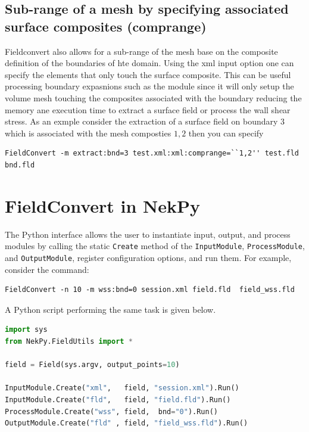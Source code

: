 %
%
\subsection{Sub-range of a mesh by specifying associated surface composites (comprange)}

Fieldconvert also allows for a sub-range of the mesh base on the
composite definition of the boundaries of hte domain. Using the xml
input option  one can specify the elements that only
touch the surface composite. This can be useful processing boundary
expasnions such as the  module since it will only setup
the volume mesh touching the composites associated with the boundary
reducing the memory ane execution time to extract a surface field or
process the wall shear stress.  As an exmple consider the extraction
of a surface field on boundary $3$ which is associated with the mesh
composties $1,2$ then you can specify
%
\begin{lstlisting}[style=BashInputStyle]
FieldConvert -m extract:bnd=3 test.xml:xml:comprange=``1,2'' test.fld bnd.fld
\end{lstlisting}

\section{FieldConvert in NekPy}

The Python interface allows the user to instantiate input,
output, and process modules by calling the static \verb+Create+ method of the
\verb+InputModule+, \verb+ProcessModule+, and \verb+OutputModule+,
register configuration options, and run them.
For example, consider the command:

\begin{lstlisting}[style=BashInputStyle]
FieldConvert -n 10 -m wss:bnd=0 session.xml field.fld  field_wss.fld
\end{lstlisting}


A Python script performing the same task is given below.

\begin{lstlisting}[style=C++Style, language=Python]
import sys
from NekPy.FieldUtils import *

field = Field(sys.argv, output_points=10)

InputModule.Create("xml",   field, "session.xml").Run()
InputModule.Create("fld",   field, "field.fld").Run()
ProcessModule.Create("wss", field,  bnd="0").Run()
OutputModule.Create("fld" , field, "field_wss.fld").Run()
\end{lstlisting}

